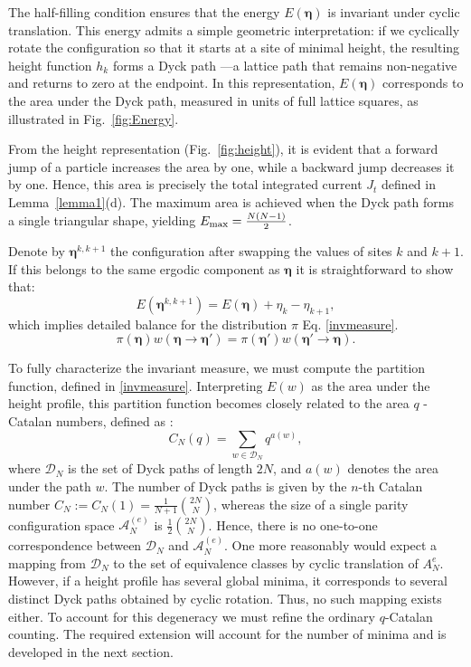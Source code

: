 \documentclass[pdflatex,sn-mathphys-num]{sn-jnl}
\theoremstyle{definition}
\theoremstyle{remark}
\numberwithin{equation}{section}
\newcommand{\bfeta}{\boldsymbol{\eta}}
\begin{document}
The half-filling condition ensures that the energy \(E(\boldsymbol{\eta})\) is invariant under cyclic translation.
This energy admits a simple geometric interpretation: if we cyclically rotate the configuration so that it starts at a site of minimal height, the resulting height function \(h_k\) forms a Dyck path \cite{deutsch1999dyck}—a lattice path that remains non-negative and returns to zero at the endpoint. In this representation, \(E(\boldsymbol{\eta})\) corresponds to the area under the Dyck path, measured in units of full lattice squares, as illustrated in Fig.~\ref{fig:Energy}.

From the height representation (Fig.~\ref{fig:height}), it is evident that a forward jump of a particle increases the area by one, while a backward jump decreases it by one. Hence, this area is precisely the total integrated current \(J_t\) defined in Lemma~\ref{lemma1}(d). The maximum area is achieved when the Dyck path forms a single triangular shape, yielding \(E_{\rm max} = \frac{N(N - 1)}{2}\).

Denote by $\bfeta^{k,k+1}$ the configuration after swapping the values of sites $k$ and $k+1$. If this belongs to the same ergodic component as $\bfeta$ it is straightforward to show that:
\begin{equation}
   E(\bfeta^{k,k+1} )=E(\bfeta )+\eta_k -\eta_{k+1}, 
\end{equation}
which implies detailed balance for the distribution $\pi$ Eq. \eqref{invmeasure}.
\begin{equation}
    \pi(\bfeta) w(\bfeta \rightarrow \bfeta') = \pi(\bfeta') w(\bfeta' \rightarrow \bfeta).
\end{equation}


To fully characterize the invariant measure, we must compute the partition function, defined in \ref{invmeasure}.
Interpreting \( E(w) \) as the area under the height profile, this partition function becomes closely related to the area \( q \) - Catalan numbers, defined as \cite{CarlitzRiordan1964}:
\[
C_N(q) = \sum_{w \in \mathcal{D}_N} q^{a(w)},
\]
where \( \mathcal{D}_N \) is the set of Dyck paths of length \( 2N \), and \( a(w) \) denotes the area under the path \( w \). The number of Dyck paths is given by the \( n \)-th Catalan number \( C_N := C_N(1) = \frac{1}{N+1} \binom{2N}{N} \), whereas the size of a single parity configuration space $\mathcal{A}_N^{(e)}$ is  \(\frac{1}{2} \binom{2N}{N} \). Hence, there is no one-to-one correspondence between \( \mathcal{D}_N \) and $\mathcal{A}_N^{(e)}$.
One more reasonably would expect a mapping from $\mathcal{D}_N$ to the set of equivalence classes by cyclic translation of $A_N^{e}$. However, 
if a height profile has several global minima, it corresponds to several distinct
Dyck paths obtained by cyclic rotation. Thus, no such mapping exists either. To account for this degeneracy we
must refine the ordinary $q$-Catalan counting.  The required extension will account for the number of minima and is developed in the next section.
\end{document}
